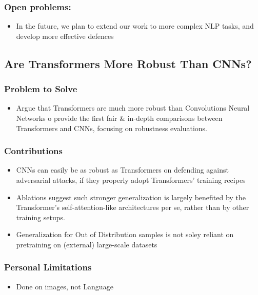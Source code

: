 \documentclass{article}
\begin{document}
\begin{flushleft}
\subsubsection*{Open problems:}
\begin{itemize}
  \item  In the future, we plan to extend our work to more complex NLP tasks, and develop more effective defences
\end{itemize}







 
 \subsection{Are Transformers More Robust Than CNNs?\cite{}} 
\subsubsection*{Problem to Solve}
\begin{itemize}
    \item Argue that Transformers are much more robust than Convolutions Neural Networks o provide the first fair & in-depth comparisons between Transformers and CNNs, focusing on robustness evaluations.
\end{itemize}

\subsubsection*{Contributions}
\begin{itemize}
 \item CNNs can easily be as robust as Transformers on defending against adversarial attacks, if they properly adopt Transformers’ training recipes
 \item Ablations suggest such stronger generalization is largely benefited by the Transformer’s self-attention-like architectures per se, rather than by other training setups.
 \item Generalization for Out of Distribution samples is not soley reliant on pretraining on (external) large-scale datasets
\end{itemize}

\subsubsection*{Personal Limitations}
\begin{itemize}
    \item Done on images, not Language 
\end{itemize}



\end{flushleft}
\end{document}
